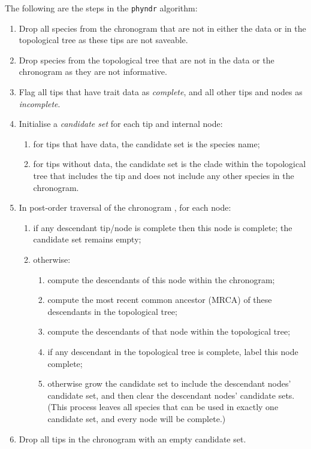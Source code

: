 \documentclass[a4paper,11pt]{article}
\newcommand{\phyndr}{\tt phyndr}
\begin{document}
The following are the steps in the {\phyndr} algorithm: 

\begin{enumerate}
\item Drop all species from the chronogram that are not in either the data or in the topological tree as these tips are not saveable.
\item Drop species from the topological tree that are not in the data or the chronogram as they are not informative.
\item Flag all tips that have trait data as \emph{complete}, and all other tips and nodes as \emph{incomplete}.
\item Initialise a \emph{candidate set} for each tip and internal node:
  \begin{enumerate}
  \item for tips that have data, the candidate set is the species name;
  \item for tips without data, the candidate set is the clade within the topological tree that includes the tip and does not include any other species in the chronogram.
  \end{enumerate}
\item In post-order traversal of the chronogram \citep{Felsenstein1973, Felsenstein1981}, for each node:
\begin{enumerate}
  \item if any descendant tip/node is complete then this node is complete; the candidate set remains empty;
  \item otherwise:
\begin{enumerate}
    \item compute the descendants of this node within the chronogram;
    \item compute the most recent common ancestor (MRCA) of these descendants in the topological tree;
    \item compute the descendants of that node within the topological tree;
    \item if any descendant in the topological tree is complete, label this node complete;
    \item otherwise grow the candidate set to include the descendant nodes' candidate set, and then clear the descendant nodes' candidate sets.  (This process leaves all species that can be used in exactly one candidate set, and every node will be complete.)
\end{enumerate}
\end{enumerate}
\item Drop all tips in the chronogram with an empty candidate set.
\end{enumerate}
\end{document}
